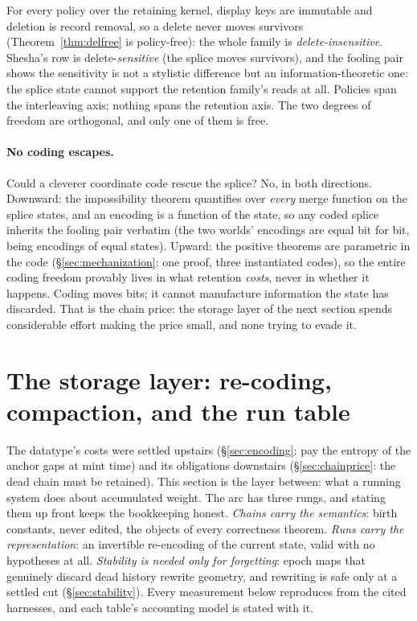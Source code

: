 \documentclass[11pt]{article}
\begin{document}
\noindent For every policy over the retaining kernel, display keys are
immutable and deletion is record removal, so a delete never moves
survivors (Theorem~\ref{thm:delfree} is policy-free): the whole family
is \emph{delete-insensitive}. Shesha's
row is delete-\emph{sensitive} (the splice moves survivors), and the
fooling pair shows the sensitivity is not a stylistic difference but an
information-theoretic one: the splice state cannot support the
retention family's reads at all. Policies span the interleaving axis;
nothing spans the retention axis. The two degrees of freedom are
orthogonal, and only one of them is free.

\paragraph{No coding escapes.} Could a cleverer coordinate code rescue
the splice? No, in both directions. Downward: the impossibility
theorem quantifies over \emph{every} merge function on the splice
states, and an encoding is a function of the state, so any coded splice
inherits the fooling pair verbatim (the two worlds' encodings are equal
bit for bit, being encodings of equal states). Upward: the positive
theorems are parametric in the code (\S\ref{sec:mechanization}: one
proof, three instantiated codes), so the entire coding freedom provably
lives in what retention \emph{costs}, never in whether it happens.
Coding moves bits; it cannot manufacture information the state has
discarded. That is the chain price: the storage layer of the next
section spends considerable effort making the price small, and none
trying to evade it.

\section{The storage layer: re-coding, compaction, and the run table}
\label{sec:storage}

The datatype's costs were settled upstairs (\S\ref{sec:encoding}: pay
the entropy of the anchor gaps at mint time) and its obligations
downstairs (\S\ref{sec:chainprice}: the dead chain must be retained).
This section is the layer between: what a running system does about
accumulated weight. The arc has three rungs, and stating them up front
keeps the bookkeeping honest. \emph{Chains carry the semantics}: birth
constants, never edited, the objects of every correctness theorem.
\emph{Runs carry the representation}: an invertible re-encoding of the
current state, valid with no hypotheses at all. \emph{Stability is
needed only for forgetting}: epoch maps that genuinely discard dead
history rewrite geometry, and rewriting is safe only at a settled cut
(\S\ref{sec:stability}). Every measurement below reproduces from the
cited harnesses, and each table's accounting model is stated with it.
\end{document}
